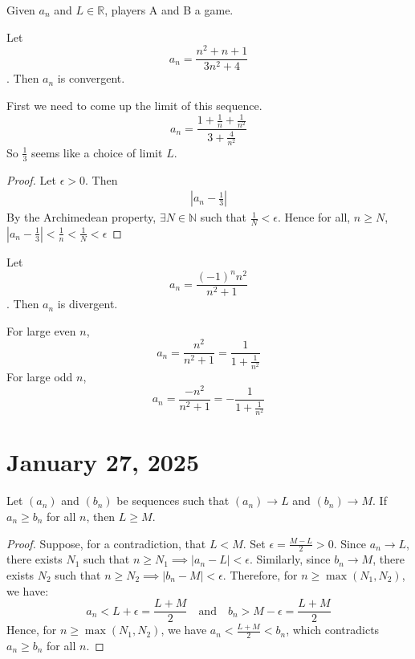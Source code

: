\documentclass[11pt]{article}
\begin{document}
Given \(a_n\) and \(L \in \mathbb{R}\), players A and B a game. \\

\begin{example}
    Let \[a_n = \frac{n^2 + n + 1}{3n^2 + 4}\]. Then \(a_n\) is convergent.
\end{example}
First we need to come up the limit of this sequence. \\
\[a_n = \frac{1 + \frac{1}{n} + \frac{1}{n^2}}{3 + \frac{4}{n^2}}\]
So \(\frac{1}{3}\) seems like a choice of limit \(L\).
\begin{proof}
    Let \(\epsilon > 0\). Then
    \begin{align*}
        \left| a_n - \frac{1}{3} \right|
    \end{align*}
    By the Archimedean property, \(\exists N \in \mathbb{N}\) such that \(\frac{1}{N} < \epsilon\). Hence for all, \(n \geqslant N\), \(\left| a_n - \frac{1}{3} \right| < \frac{1}{n} < \frac{1}{N} < \epsilon\)
\end{proof}

\begin{example}
    Let \[a_n = \frac{(-1)^n n^2 }{n^2 + 1}\]. Then \(a_n\) is divergent.
\end{example}
For large even \(n\), \[a_n = \frac{n^2}{n^2 + 1} = \frac{1}{1 + \frac{1}{n^2}}\]
For large odd \(n\), \[a_n = \frac{-n^2}{n^2 + 1} = -\frac{1}{1 + \frac{1}{n^2}}\]

\section{January 27, 2025}
\begin{theorem}
    Let $(a_n)$ and $(b_n)$ be sequences such that $(a_n) \to L$ and $(b_n) \to M$. If $a_n \geq b_n$ for all $n$, then $L \geq M$.
\end{theorem}

\begin{proof}
    Suppose, for a contradiction, that $L < M$. Set $\epsilon = \frac{M - L}{2} > 0$. Since $a_n \to L$, there exists $N_1$ such that $n \geq N_1 \implies |a_n - L| < \epsilon$. Similarly, since $b_n \to M$, there exists $N_2$ such that $n \geq N_2 \implies |b_n - M| < \epsilon$. Therefore, for $n \geq \max(N_1, N_2)$, we have:
    \[
        a_n < L + \epsilon = \frac{L + M}{2} \quad \text{and} \quad b_n > M - \epsilon = \frac{L + M}{2}
    \]
    Hence, for $n \geq \max(N_1, N_2)$, we have $a_n < \frac{L + M}{2} < b_n$,
    which contradicts $a_n \geq b_n$ for all $n$.
\end{proof}
\end{document}
